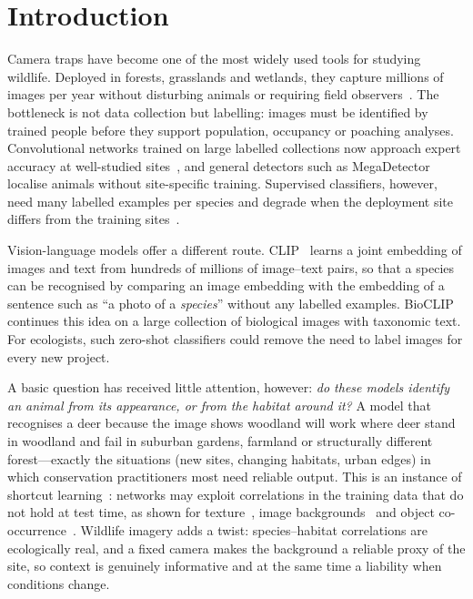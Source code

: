 \documentclass[conference]{IEEEtran}
\begin{document}
\section{Introduction}
Camera traps have become one of the most widely used tools for studying wildlife. Deployed in forests, grasslands and wetlands, they capture millions of images per year without disturbing animals or requiring field observers~\cite{swanson2015,burton2015}. The bottleneck is not data collection but labelling: images must be identified by trained people before they support population, occupancy or poaching analyses. Convolutional networks trained on large labelled collections now approach expert accuracy at well-studied sites~\cite{norouzzadeh2018,tabak2019,willi2019}, and general detectors such as MegaDetector~\cite{beery2019} localise animals without site-specific training. Supervised classifiers, however, need many labelled examples per species and degrade when the deployment site differs from the training sites~\cite{beery2018,schneider2020}.

Vision-language models offer a different route. CLIP~\cite{radford2021} learns a joint embedding of images and text from hundreds of millions of image--text pairs, so that a species can be recognised by comparing an image embedding with the embedding of a sentence such as ``a photo of a \emph{species}'' without any labelled examples. BioCLIP~\cite{stevens2024} continues this idea on a large collection of biological images with taxonomic text. For ecologists, such zero-shot classifiers could remove the need to label images for every new project.

A basic question has received little attention, however: \emph{do these models identify an animal from its appearance, or from the habitat around it?} A model that recognises a deer because the image shows woodland will work where deer stand in woodland and fail in suburban gardens, farmland or structurally different forest---exactly the situations (new sites, changing habitats, urban edges) in which conservation practitioners most need reliable output. This is an instance of shortcut learning~\cite{geirhos2020}: networks may exploit correlations in the training data that do not hold at test time, as shown for texture~\cite{geirhos2019}, image backgrounds~\cite{xiao2021} and object co-occurrence~\cite{singh2020}. Wildlife imagery adds a twist: species--habitat correlations are ecologically real, and a fixed camera makes the background a reliable proxy of the site, so context is genuinely informative and at the same time a liability when conditions change.
\end{document}
